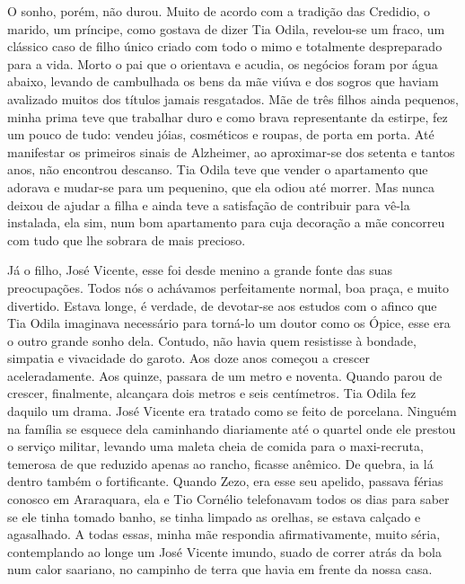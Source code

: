 O sonho, porém, não durou.
Muito de acordo com a tradição das Credidio, o marido, um príncipe, como gostava de dizer Tia Odila, revelou-se um fraco, um clássico caso de filho único criado com todo o mimo e totalmente despreparado para a vida.
Morto o pai que o orientava e acudia, os negócios foram por água abaixo, levando de cambulhada os bens da mãe viúva e dos sogros que haviam avalizado muitos dos títulos jamais resgatados.
Mãe de três filhos ainda pequenos, minha prima teve que trabalhar duro e como brava representante da estirpe, fez um pouco de tudo: vendeu jóias, cosméticos e roupas, de porta em porta.
Até manifestar os primeiros sinais de Alzheimer, ao  aproximar-se  dos setenta e tantos anos, não encontrou descanso.
Tia Odila teve que vender o apartamento que adorava e mudar-se para um pequenino, que ela odiou até morrer.
Mas nunca deixou de ajudar a filha e ainda teve a satisfação de contribuir para vê-la instalada, ela sim, num bom apartamento para cuja decoração a mãe concorreu com tudo que lhe sobrara de mais precioso.

Já o filho, José Vicente, esse foi desde menino a grande fonte das suas preocupações.
Todos nós o achávamos perfeitamente normal, boa praça, e muito divertido.
Estava longe, é verdade, de devotar-se aos estudos com o afinco que Tia Odila imaginava necessário para torná-lo um doutor como os Ópice, esse era o outro grande sonho dela.
 Contudo, não havia quem resistisse à bondade, simpatia e vivacidade do garoto.
Aos doze anos começou a crescer aceleradamente.
Aos quinze, passara de um metro e noventa.
 Quando parou de crescer, finalmente, alcançara dois metros e seis centímetros.
Tia Odila fez daquilo um drama.
José Vicente era tratado como se feito de porcelana.
Ninguém na família se esquece dela caminhando diariamente até o quartel onde ele prestou o serviço militar, levando uma maleta cheia de comida para o maxi-recruta, temerosa de que reduzido apenas ao rancho, ficasse anêmico.
De quebra, ia lá dentro também o fortificante.
Quando Zezo, era esse seu apelido, passava férias conosco em Araraquara, ela e Tio Cornélio telefonavam todos os dias para saber se ele tinha tomado banho, se tinha limpado as orelhas, se estava calçado e agasalhado.
A todas essas, minha mãe respondia afirmativamente, muito séria, contemplando ao longe um José Vicente imundo, suado de correr atrás da bola num calor saariano, no campinho de terra que havia em frente da nossa casa.


